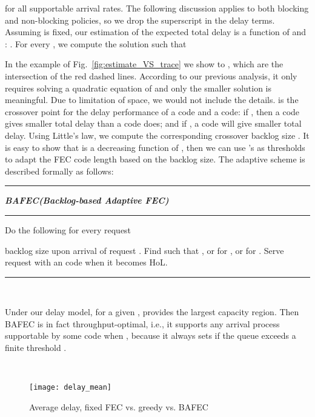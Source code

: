 \documentclass[journal]{IEEEtran}
\newcommand{\nonBlocking}{{BAFEC}\xspace}
\begin{document}
for all supportable arrival rates. The following discussion applies to both blocking and non-blocking policies, so we drop the superscript in the delay terms.  
Assuming  is fixed, our estimation of the expected total delay  is a function of   and : . For every , we compute the solution  such that

In the example of Fig.~\ref{fig:estimate_VS_trace} we show  to , which are the intersection of the red dashed lines.
According to our previous analysis, it only requires solving a quadratic equation of  and only the smaller solution is meaningful. Due to limitation of space, we would not include the details.   
 is the crossover point for the delay performance of a  code and a  code: if , then a  code gives smaller total delay than a  code does; and if , a  code will give smaller total delay.  Using Little's law, we compute the corresponding crossover backlog size . It is easy to show that  is a decreasing function of , then we can use 's as thresholds to adapt the FEC code length based on the backlog size. The adaptive scheme is described formally as follows:

\vspace{5pt}
\hrule
\vspace{2pt}
\noindent \textit{\textbf{\nonBlocking (Backlog-based Adaptive FEC)}}
\hrule
\vspace{2pt}


\noindent Do the following for every request 

\begin{algorithmic} [1]

\STATE  backlog size upon arrival of request .
\STATE Find  such that , or  for , or  for .
\STATE Serve request  with an  code when it becomes HoL.
\end{algorithmic}
\hrule

~

Under our delay model, for a given ,  provides the largest capacity region. Then \nonBlocking is in fact throughput-optimal, i.e., it supports any arrival process supportable by some  code when , because it always sets  if the queue exceeds a finite threshold .   

~

\begin{figure}[t]
\centering
\texttt{[image: delay\_mean]}
\vspace{-10pt}
\caption{Average delay, fixed FEC vs. greedy vs. \nonBlocking}
\label{fig:delay:mean}
\end{figure}
\end{document}
